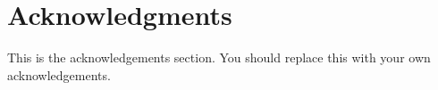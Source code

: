 % 

\cleardoublepage

\section*{Acknowledgments}

This is the acknowledgements section.  You should replace this with your
own acknowledgements.

